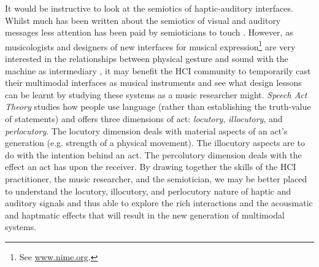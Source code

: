 \documentclass[runningheads]{llncs}
\begin{document}
It would be instructive to look at the semiotics of haptic-auditory interfaces. Whilst much has been written about the semiotics of visual and auditory messages less attention has been paid by semioticians to touch \cite{McGee:2003}. However, as musicologists and designers of new interfaces for musical expression\footnote{See \url{www.nime.org}.} are very interested in the relationships between physical gesture and sound with the machine as intermediary \cite{Magnusson:2006}, it may benefit the HCI community to temporarily cast their multimodal interfaces as musical instruments and see what design lessons can be learnt by studying these systems as a music researcher might. 
\emph{Speech Act Theory} \cite{Winograd:1986} studies how people use language (rather than establishing the truth-value of statements) \cite{McGee:2003} and offers three dimensions of act: \emph{locutory}, \emph{illocutory}, and \emph{perlocutory}. The locutory dimension deals with material aspects of an act's generation (e.g. strength of a physical movement). The illocutory aspects are to do with the intention behind an act. The percolutory dimension deals with the effect an act has upon the receiver.  By drawing together the skills of the HCI practitioner, the music researcher, and the semiotician, we may be better placed to understand the locutory, illocutory, and perlocutory nature of haptic and auditory signals and thus able to explore the rich interactions and the acousmatic and haptmatic effects that will result in the new generation of multimodal systems.
 
\end{document}
